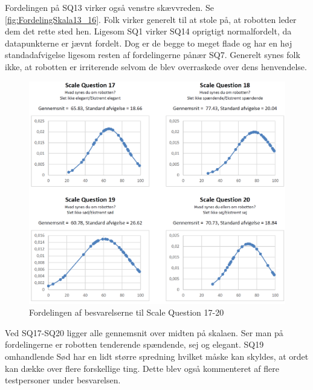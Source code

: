\noindent
%
Fordelingen på SQ13 virker også venstre skævvreden. Se \autoref{fig:FordelingSkala13_16}. Folk virker generelt til at stole på, at robotten leder dem det rette sted hen. Ligesom SQ1 virker SQ14 oprigtigt normalfordelt, da datapunkterne er jævnt fordelt. Dog er de begge to meget flade og har en høj standadafvigelse ligesom resten af fordelingerne pånær SQ7. Generelt synes folk ikke, at robotten er irriterende selvom de blev overraskede over dens henvendelse. 
%
\begin{figure}[H]
\centering
\includegraphics[width =\textwidth]{Figure/DatabehandlingSkalaer/FordelingSkala17_20} 
\caption{Fordelingen af besvarelserne til Scale Question 17-20}
\label{fig:FordelingSkala17_20}
\end{figure}
\noindent
%
Ved SQ17-SQ20 ligger alle gennemsnit over midten på skalaen. Ser man på fordelingerne er robotten tenderende spændende, sej og elegant. SQ19 omhandlende Sød har en lidt større spredning hvilket måske kan skyldes, at ordet kan dække over flere forskellige ting. Dette blev også kommenteret af flere testpersoner under besvarelsen. 
%
